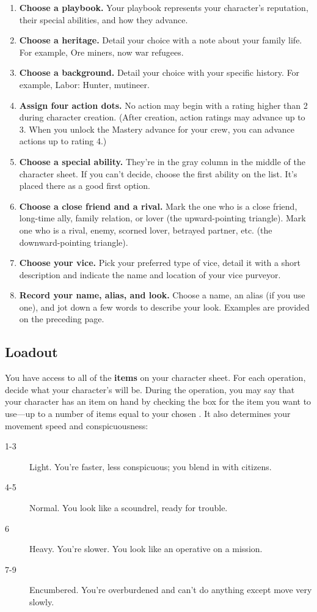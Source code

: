 \begin{enumerate}
\item \textbf{Choose a playbook.} Your playbook represents your character’s reputation, their special abilities, and how they advance.
\item \textbf{Choose a heritage.} Detail your choice with a note about your family life. For example, Ore miners, now war refugees.
\item \textbf{Choose a background.} Detail your choice with your specific history. For example, Labor: Hunter, mutineer.
\item \textbf{Assign four action dots.} No action may begin with a rating higher than 2 during character creation. (After creation, action ratings may advance up to 3. When you unlock the Mastery advance for your crew, you can advance actions up to rating 4.)
\item \textbf{Choose a special ability.} They’re in the gray column in the middle of the character sheet. If you can’t decide, choose the first ability on the list. It’s placed there as a good first option.
\item \textbf{Choose a close friend and a rival.} Mark the one who is a close friend, long-time ally, family relation, or lover (the upward-pointing triangle). Mark one who is a rival, enemy, scorned lover, betrayed partner, etc. (the downward-pointing triangle).
\item \textbf{Choose your vice.} Pick your preferred type of vice, detail it with a short description and indicate the name and location of your vice purveyor.
\item \textbf{Record your name, alias, and look.} Choose a name, an alias (if you use one), and jot down a few words to describe your look. Examples are provided on the preceding page.
\end{enumerate}

\subsection{Loadout}

You have access to all of the \textbf{items} on your character sheet. For each operation, decide what your character’s  will be. During the operation, you may say that your character has an item on hand by checking the box for the item you want to use—up to a number of items equal to your chosen . It also determines your movement speed and conspicuousness:

\begin{description}
\item[1-3 ] Light. You’re faster, less conspicuous; you blend in with citizens.
\item[4-5 ] Normal. You look like a scoundrel, ready for trouble.
\item[\hspace{0.83em}6 ] Heavy. You’re slower. You look like an operative on a mission.
\item[7-9 ] Encumbered. You’re overburdened and can’t do anything except move very slowly.
\end{description}

